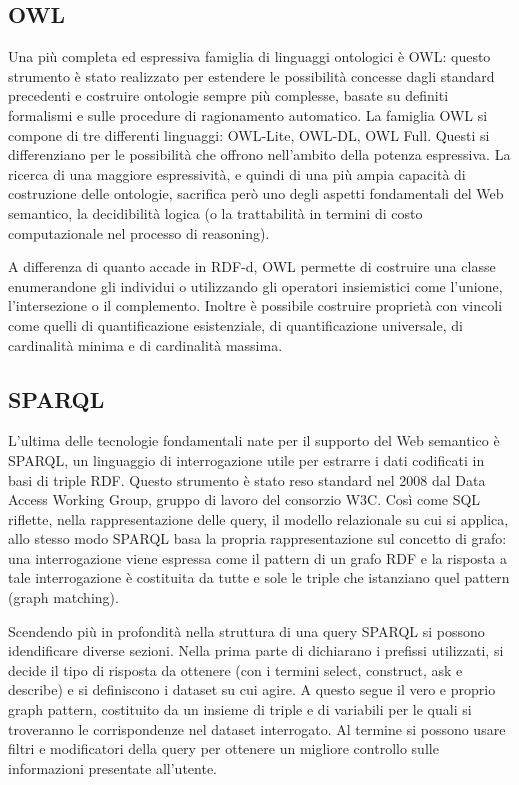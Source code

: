\documentclass[Lau,binding=0.6cm,noexaminfo,oneside]{sapthesis}
\begin{document}
\subsection{OWL}
Una più completa ed espressiva famiglia di linguaggi ontologici è OWL: questo strumento è stato realizzato per estendere le possibilità concesse dagli standard precedenti e costruire ontologie sempre più complesse, basate su definiti formalismi e sulle procedure di ragionamento automatico. La famiglia OWL si compone di tre differenti linguaggi: OWL-Lite, OWL-DL, OWL Full.
Questi si differenziano per le possibilità che offrono nell'ambito della potenza espressiva. La ricerca di una maggiore espressività, e quindi di una più ampia capacità di costruzione delle ontologie, sacrifica però uno degli aspetti fondamentali del Web semantico, la decidibilità logica (o la trattabilità in termini di costo computazionale nel processo di reasoning).\medskip

A differenza di quanto accade in RDF-d, OWL permette di costruire una classe enumerandone gli individui o utilizzando gli operatori insiemistici come l'unione, l'intersezione o il complemento. Inoltre è possibile costruire proprietà con vincoli come quelli di quantificazione esistenziale,  di quantificazione universale, di cardinalità minima e di cardinalità massima.\medskip

\subsection{SPARQL}
L'ultima delle tecnologie fondamentali nate per il supporto del Web semantico è SPARQL, un linguaggio di interrogazione utile per estrarre i dati codificati in basi di triple RDF. Questo strumento è stato reso standard nel 2008 dal Data Access Working Group, gruppo di lavoro del consorzio W3C. Così come SQL riflette, nella rappresentazione delle query, il modello relazionale su cui si applica, allo stesso modo SPARQL basa la propria rappresentazione sul concetto di grafo: una interrogazione viene espressa come il pattern di un grafo RDF e la risposta a tale interrogazione è costituita da tutte e sole le triple che istanziano quel pattern (graph matching).\medskip

Scendendo più in profondità nella struttura di una query SPARQL si possono idendificare diverse sezioni. Nella prima parte di dichiarano i prefissi utilizzati, si decide il tipo di risposta da ottenere (con i termini select, construct, ask e describe) e si definiscono i dataset su cui agire. A questo segue il vero e proprio graph pattern, costituito da un insieme di triple e di variabili per le quali si troveranno le corrispondenze nel dataset interrogato. Al termine si possono usare filtri e modificatori della query per ottenere un migliore controllo sulle informazioni presentate all'utente.\medskip
\end{document}

